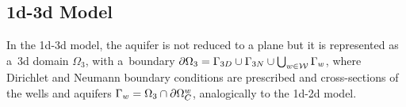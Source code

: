 % 
% 
% 

\subsection{1d-3d Model}
In the 1d-3d model, the aquifer is not reduced to a plane but it is represented as a~3d domain $\Omega_3$,
with a~boundary $\partial\Omega_3 = \Gamma_{3D} \cup \Gamma_{3N} \cup \bigcup_{\substack{w\in\mathcal{W}}} \Gamma_w$,
where Dirichlet and Neumann boundary conditions are prescribed and cross-sections of the wells and aquifers $\Gamma_w = \Omega_3 \cap \partial\Omega^w_C$,
analogically to the 1d-2d model.

